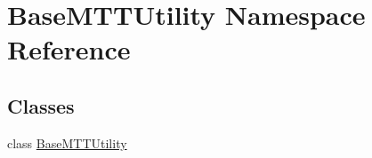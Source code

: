 \hypertarget{namespaceBaseMTTUtility}{\section{Base\-M\-T\-T\-Utility Namespace Reference}
\label{namespaceBaseMTTUtility}
}
\subsection*{Classes}
\begin{DoxyCompactItemize}
\item 
class \hyperlink{classBaseMTTUtility_1_1BaseMTTUtility}{Base\-M\-T\-T\-Utility}
\end{DoxyCompactItemize}
